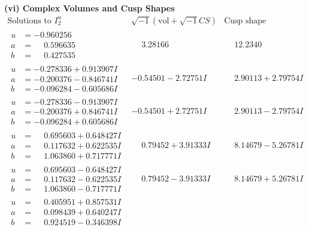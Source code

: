 \documentclass[1p]{elsarticle_modified}
\theoremstyle{definition}
\newcommand{\I}{\sqrt{-1}}
\begin{document}
\newpage\flushleft \textbf{(vi) Complex Volumes and Cusp Shapes}
$$\begin{array}{c|c|c}  
\text{Solutions to }I^u_{2}& \I (\text{vol} + \sqrt{-1}CS) & \text{Cusp shape}\\
 \hline 
\begin{aligned}
u &= -0.960256\phantom{ +0.000000I} \\
a &= \phantom{-}0.596635\phantom{ +0.000000I} \\
b &= \phantom{-}0.427535\phantom{ +0.000000I}\end{aligned}
 & \phantom{-}3.28166\phantom{ +0.000000I} & \phantom{-}12.2340\phantom{ +0.000000I} \\ \hline\begin{aligned}
u &= -0.278336 + 0.913907 I \\
a &= -0.200376 - 0.846741 I \\
b &= -0.096284 - 0.605686 I\end{aligned}
 & -0.54501 - 2.72751 I & \phantom{-}2.90113 + 2.79754 I \\ \hline\begin{aligned}
u &= -0.278336 - 0.913907 I \\
a &= -0.200376 + 0.846741 I \\
b &= -0.096284 + 0.605686 I\end{aligned}
 & -0.54501 + 2.72751 I & \phantom{-}2.90113 - 2.79754 I \\ \hline\begin{aligned}
u &= \phantom{-}0.695603 + 0.648427 I \\
a &= \phantom{-}0.117632 + 0.622535 I \\
b &= \phantom{-}1.063860 + 0.717771 I\end{aligned}
 & \phantom{-}0.79452 + 3.91333 I & \phantom{-}8.14679 - 5.26781 I \\ \hline\begin{aligned}
u &= \phantom{-}0.695603 - 0.648427 I \\
a &= \phantom{-}0.117632 - 0.622535 I \\
b &= \phantom{-}1.063860 - 0.717771 I\end{aligned}
 & \phantom{-}0.79452 - 3.91333 I & \phantom{-}8.14679 + 5.26781 I \\ \hline\begin{aligned}
u &= \phantom{-}0.405951 + 0.857531 I \\
a &= \phantom{-}0.098439 + 0.640247 I \\
b &= \phantom{-}0.924519 - 0.346398 I\end{aligned}

\end{array}$$
\end{document}

